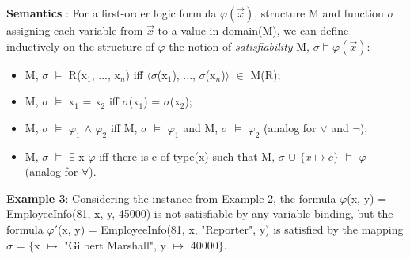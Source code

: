 \documentclass[11pt, a4paper, dvipsnames]{article}
\begin{document}
\textbf{Semantics} : For a first-order logic formula $\varphi(\vec{x})$, structure M and function $\sigma$ assigning each variable from $\vec{x}$ to a value in domain(M), we can define inductively on the structure of $\varphi$ the notion of \textit{satisfiability} M, $\sigma \vDash \varphi(\vec{x})$:
\begin{itemize}
	\item M, $\sigma$ $\vDash$ R(x$_{1}$, ..., x$_{n}$) iff $\langle\sigma$(x$_{1}$), ..., $\sigma$(x$_{n}$)$\rangle$ $\in$ M(R);
	\item M, $\sigma$ $\vDash$ x$_{1}$ = x$_{2}$ iff $\sigma$(x$_{1}$) = $\sigma$(x$_{2}$);
	\item M, $\sigma$ $\vDash$ $\varphi_{1}$ $\wedge$ $\varphi_{2}$ iff M, $\sigma$ $\vDash$ $\varphi_{1}$ and M, $\sigma$ $\vDash$ $\varphi_{2}$ (analog for $\vee$ and $\neg$);
	\item M, $\sigma$ $\vDash$ $\exists$ x $\varphi$ iff there is c of type(x) such that M, $\sigma$ $\cup$ $\{x \mapsto c\}$ $\vDash$ $\varphi$ (analog for $\forall$).
\end{itemize}
\textbf{Example 3}: Considering the instance from Example 2, the formula \newline $\varphi$(x, y) = EmployeeInfo(81, x, y, 45000) is not satisfiable by any variable binding, but the formula $\varphi'$(x, y) = EmployeeInfo(81, x, "Reporter", y) is satisfied by the mapping\newline $\sigma$ = $\{$x $\mapsto$ "Gilbert Marshall", y $\mapsto$ 40000$\}$.
\end{document}
